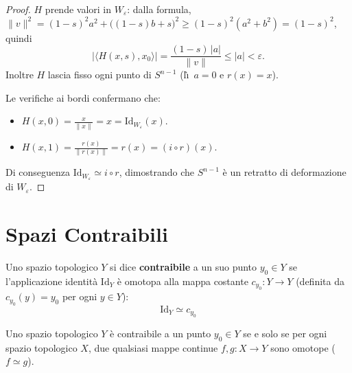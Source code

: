 \begin{proof}
$H$ prende valori in $W_\varepsilon$: dalla formula,
$\|v\|^2 = (1-s)^2 a^2 + \big((1-s)b + s\big)^2 \geqslant (1-s)^2 (a^2 + b^2) = (1-s)^2$, quindi
\[
|\langle H(x,s), x_0 \rangle| = \frac{(1-s)\,|a|}{\|v\|} \leqslant |a| < \varepsilon .
\]
Inoltre $H$ lascia fisso ogni punto di $S^{n-1}$ (l\`\i\ $a=0$ e $r(x)=x$).

Le verifiche ai bordi confermano che:
\begin{itemize}
    \item $H(x,0) = \frac{x}{\|x\|} = x = \mathrm{Id}_{W_\varepsilon}(x)$.
    \item $H(x,1) = \frac{r(x)}{\|r(x)\|} = r(x) = (i \circ r)(x)$.
\end{itemize}
Di conseguenza $\mathrm{Id}_{W_\varepsilon} \simeq i \circ r$, dimostrando che $S^{n-1}$ è un retratto di deformazione di $W_\varepsilon$.
\end{proof}

\vspace{2em}

\section{Spazi Contraibili}

\begin{definicion}
Uno spazio topologico $Y$ si dice \textbf{contraibile} a un suo punto $y_0 \in Y$ se l'applicazione identità $\mathrm{Id}_Y$ è omotopa alla mappa costante $c_{y_0}: Y \to Y$ (definita da $c_{y_0}(y) = y_0$ per ogni $y \in Y$):
\[
\mathrm{Id}_Y \simeq c_{y_0}
\]
\end{definicion}


\begin{teo}
Uno spazio topologico $Y$ è contraibile a un punto $y_0 \in Y$ se e solo se per ogni spazio topologico $X$, due qualsiasi mappe continue $f, g: X \to Y$ sono omotope ($f \simeq g$).
\end{teo}

